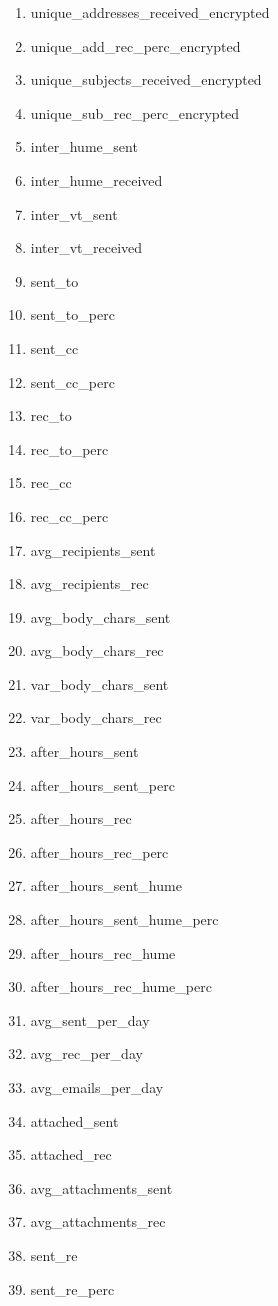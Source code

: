 \documentclass[12pt]{report}
\begin{document}
\begin{multicols}{2}
\begin{enumerate}
	\item unique\_addresses\_received\_encrypted
	\item unique\_add\_rec\_perc\_encrypted
	\item unique\_subjects\_received\_encrypted
	\item unique\_sub\_rec\_perc\_encrypted
	\item inter\_hume\_sent
	\item inter\_hume\_received
	\item inter\_vt\_sent
	\item inter\_vt\_received
	\item sent\_to
	\item sent\_to\_perc
	\item sent\_cc
	\item sent\_cc\_perc
	\item rec\_to
	\item rec\_to\_perc
	\item rec\_cc
	\item rec\_cc\_perc
	\item avg\_recipients\_sent
	\item avg\_recipients\_rec
	\item avg\_body\_chars\_sent
	\item avg\_body\_chars\_rec
	\item var\_body\_chars\_sent
	\item var\_body\_chars\_rec
	\item after\_hours\_sent
	\item after\_hours\_sent\_perc
	\item after\_hours\_rec
	\item after\_hours\_rec\_perc
	\item after\_hours\_sent\_hume
	\item after\_hours\_sent\_hume\_perc
	\item after\_hours\_rec\_hume
	\item after\_hours\_rec\_hume\_perc
	\item avg\_sent\_per\_day
	\item avg\_rec\_per\_day
	\item avg\_emails\_per\_day
	\item attached\_sent
	\item attached\_rec
	\item avg\_attachments\_sent
	\item avg\_attachments\_rec
	\item sent\_re
	\item sent\_re\_perc

\end{enumerate}
\end{multicols}
\end{document}
